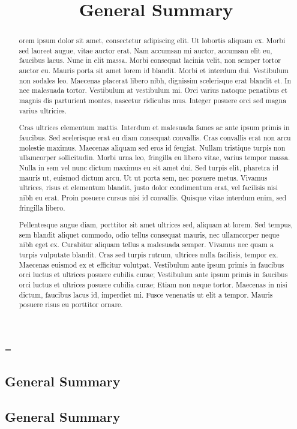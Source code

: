 \emergencystretch=\maxdimen
{}


\begin{refsection}

\title{General Summary}

\chapter{General Summary}

\vspace{-2cm}

\section*{General Summary}
\begin{abstract}
orem ipsum dolor sit amet, consectetur adipiscing elit. Ut lobortis aliquam ex. Morbi sed laoreet augue, vitae auctor erat. Nam accumsan mi auctor, accumsan elit eu, faucibus lacus. Nunc in elit massa. Morbi consequat lacinia velit, non semper tortor auctor eu. Mauris porta sit amet lorem id blandit. Morbi et interdum dui. Vestibulum non sodales leo. Maecenas placerat libero nibh, dignissim scelerisque erat blandit et. In nec malesuada tortor. Vestibulum at vestibulum mi. Orci varius natoque penatibus et magnis dis parturient montes, nascetur ridiculus mus. Integer posuere orci sed magna varius ultricies.

Cras ultrices elementum mattis. Interdum et malesuada fames ac ante ipsum primis in faucibus. Sed scelerisque erat eu diam consequat convallis. Cras convallis erat non arcu molestie maximus. Maecenas aliquam sed eros id feugiat. Nullam tristique turpis non ullamcorper sollicitudin. Morbi urna leo, fringilla eu libero vitae, varius tempor massa. Nulla in sem vel nunc dictum maximus eu sit amet dui. Sed turpis elit, pharetra id mauris ut, euismod dictum arcu. Ut ut porta sem, nec posuere metus. Vivamus ultrices, risus et elementum blandit, justo dolor condimentum erat, vel facilisis nisi nibh eu erat. Proin posuere cursus nisi id convallis. Quisque vitae interdum enim, sed fringilla libero.

Pellentesque augue diam, porttitor sit amet ultrices sed, aliquam at lorem. Sed tempus, sem blandit aliquet commodo, odio tellus consequat mauris, nec ullamcorper neque nibh eget ex. Curabitur aliquam tellus a malesuada semper. Vivamus nec quam a turpis vulputate blandit. Cras sed turpis rutrum, ultrices nulla facilisis, tempor ex. Maecenas euismod ex et efficitur volutpat. Vestibulum ante ipsum primis in faucibus orci luctus et ultrices posuere cubilia curae; Vestibulum ante ipsum primis in faucibus orci luctus et ultrices posuere cubilia curae; Etiam non neque tortor. Maecenas in nisi dictum, faucibus lacus id, imperdiet mi. Fusce venenatis ut elit a tempor. Mauris posuere risus eu porttitor ornare.


\end{abstract}
\end{refsection}
